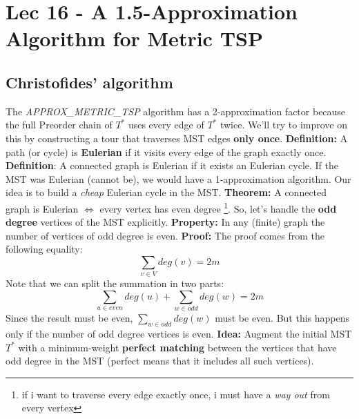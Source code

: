 \chapter{Lec 16 - A 1.5-Approximation Algorithm for Metric TSP}

\section{Christofides' algorithm}
The \textit{APPROX\_METRIC\_TSP} algorithm has a 2-approximation factor because the full Preorder chain of $T^*$ uses every edge of $T^*$ twice. We'll try to improve on this by constructing a tour that traverses MST edges \textbf{only once}.\newline\newline
\textbf{Definition:} A path (or cycle) is \textbf{Eulerian} if it visits every edge of the graph exactly once.\newline\newline
\textbf{Definition}: A connected graph is Eulerian if it exists an Eulerian cycle.\newline\newline
If the MST was Eulerian (cannot be), we would have a 1-approximation algorithm. Our idea is to build a \textit{cheap} Eulerian cycle in the MST.\newline\newline
\textbf{Theorem:} A connected graph is Eulerian $\iff$ every vertex has even degree \footnote{if i want to traverse every edge exactly once, i must have a \textit{way out} from every vertex}.\newline\newline
So, let's handle the \textbf{odd degree} vertices of the MST explicitly.\newline\newline
\textbf{Property:} In any (finite) graph the number of vertices of odd degree is even.\newline\newline
\textbf{Proof:} The proof comes from the following equality:
\[\sum_{v \in V}deg(v) = 2m\]
Note that we can split the summation in two parts:
\[\sum_{u \in even} deg(u) + \sum_{w \in odd}deg(w) = 2m\]
Since the result must be even, $\sum_{w \in odd}deg(w)$ must be even. But this happens only if the number of odd degree vertices is even.\newline\newline
\textbf{Idea:} Augment the initial MST $T^*$ with a minimum-weight \textbf{perfect matching} between the vertices that have odd degree in the MST (perfect means that it includes all such vertices).\newline\newline
